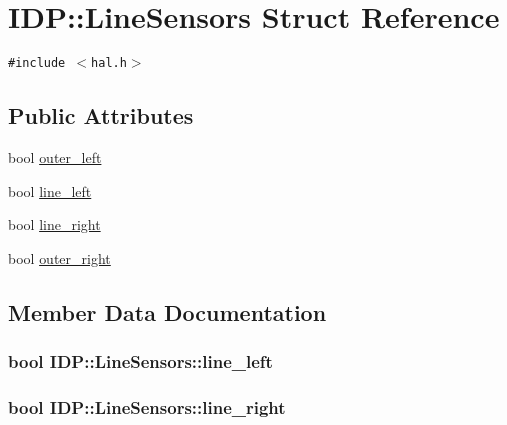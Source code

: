 \hypertarget{structIDP_1_1LineSensors}{
\section{IDP::LineSensors Struct Reference}
\label{structIDP_1_1LineSensors}
}
{\tt \#include $<$hal.h$>$}

\subsection*{Public Attributes}
\begin{CompactItemize}
\item 
bool \hyperlink{structIDP_1_1LineSensors_51c88077f39fead3a34ef115bdcdc7f1}{outer\_\-left}
\item 
bool \hyperlink{structIDP_1_1LineSensors_7b100b91da805356d2d138311029bc5a}{line\_\-left}
\item 
bool \hyperlink{structIDP_1_1LineSensors_13a49feb63d5ced6b51b1d5be7f5109a}{line\_\-right}
\item 
bool \hyperlink{structIDP_1_1LineSensors_73f08dd5931bdc244d94f578f7dd0a17}{outer\_\-right}
\end{CompactItemize}


\subsection{Member Data Documentation}
\hypertarget{structIDP_1_1LineSensors_7b100b91da805356d2d138311029bc5a}{
\subsubsection[{line\_\-left}]{\setlength{\rightskip}{0pt plus 5cm}bool {\bf IDP::LineSensors::line\_\-left}}}
\label{structIDP_1_1LineSensors_7b100b91da805356d2d138311029bc5a}


\hypertarget{structIDP_1_1LineSensors_13a49feb63d5ced6b51b1d5be7f5109a}{
\subsubsection[{line\_\-right}]{\setlength{\rightskip}{0pt plus 5cm}bool {\bf IDP::LineSensors::line\_\-right}}}
\label{structIDP_1_1LineSensors_13a49feb63d5ced6b51b1d5be7f5109a}


